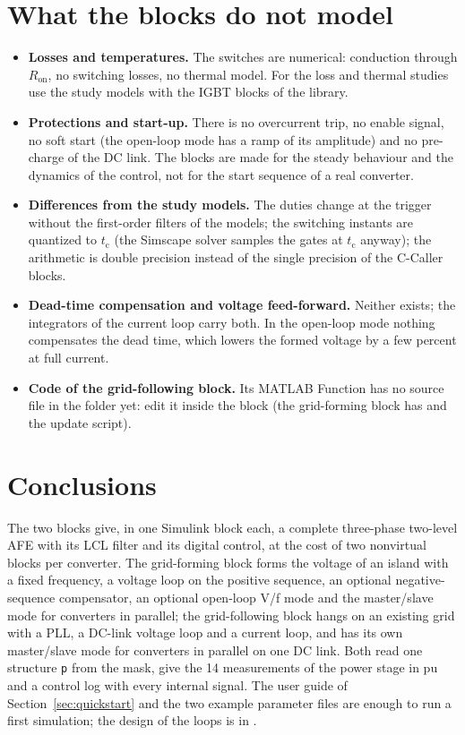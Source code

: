 \documentclass[11pt,a4paper]{scrartcl}
\newcommand{\ped}[1]{_{\mathrm{#1}}}
\newcommand{\code}[1]{\texttt{#1}}
\begin{document}
\begin{onehalfspace}
\section{What the blocks do not model}
\label{sec:limits}

\begin{itemize}[nosep]
	\item \textbf{Losses and temperatures.} The switches are numerical: conduction through $R\ped{on}$, no switching losses, no thermal model. For the loss and thermal studies use the study models with the IGBT blocks of the library.
	\item \textbf{Protections and start-up.} There is no overcurrent trip, no enable signal, no soft start (the open-loop mode has a ramp of its amplitude) and no pre-charge of the DC link. The blocks are made for the steady behaviour and the dynamics of the control, not for the start sequence of a real converter.
	\item \textbf{Differences from the study models.} The duties change at the trigger without the first-order filters of the models; the switching instants are quantized to $t\ped{c}$ (the Simscape solver samples the gates at $t\ped{c}$ anyway); the arithmetic is double precision instead of the single precision of the C-Caller blocks.
	\item \textbf{Dead-time compensation and voltage feed-forward.} Neither exists; the integrators of the current loop carry both. In the open-loop mode nothing compensates the dead time, which lowers the formed voltage by a few percent at full current.
	\item \textbf{Code of the grid-following block.} Its MATLAB Function has no source file in the folder yet: edit it inside the block (the grid-forming block has  and the update script).
\end{itemize}

\section{Conclusions}
\label{sec:conclusions}

The two blocks give, in one Simulink block each, a complete three-phase two-level AFE with its LCL filter and its digital control, at the cost of two nonvirtual blocks per converter. The grid-forming block forms the voltage of an island with a fixed frequency, a voltage loop on the positive sequence, an optional negative-sequence compensator, an optional open-loop V/f mode and the master/slave mode for converters in parallel; the grid-following block hangs on an existing grid with a PLL, a DC-link voltage loop and a current loop, and has its own master/slave mode for converters in parallel on one DC link. Both read one structure \code{p} from the mask, give the 14 measurements of the power stage in pu and a control log with every internal signal. The user guide of Section~\ref{sec:quickstart} and the two example parameter files are enough to run a first simulation; the design of the loops is in \cite{gfm_note}.


\end{onehalfspace}
\end{document}
